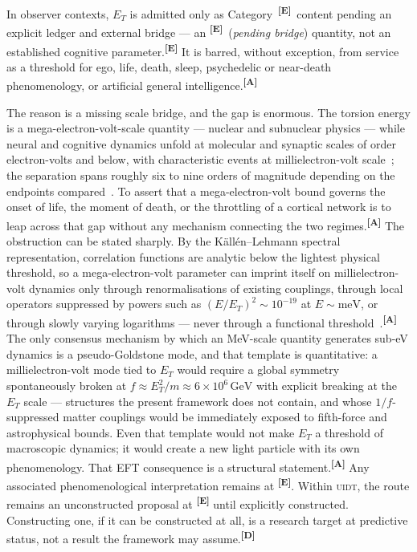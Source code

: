 \documentclass[12pt,a4paper,twoside]{article}
\theoremstyle{plain}
\theoremstyle{definition}
\theoremstyle{remark}
\newcommand{\UIDT}{\textsc{uidt}}
\newcommand{\catmark}[1]{\textsuperscript{\textsf{\textbf{[#1]}}}}
\begin{document}
In observer contexts, $E_T$ is admitted only as Category~\catmark{E}\
content pending an explicit ledger and external bridge --- an
\catmark{E}\ (\emph{pending bridge}) quantity, not an established cognitive
parameter.\catmark{E} It is barred, without exception, from service as a
threshold for ego, life, death, sleep, psychedelic or near-death
phenomenology, or artificial general intelligence.\catmark{A}

The reason is a missing scale bridge, and the gap is enormous. The
torsion energy is a mega-electron-volt-scale quantity --- nuclear and
subnuclear physics --- while neural and cognitive dynamics unfold at
molecular and synaptic scales of order electron-volts and below, with
characteristic events at millielectron-volt scale~\cite{attwell2001,harris2012,levy2021}; the separation spans
roughly six to nine orders of magnitude depending on the endpoints
compared~\cite{appelquist1975}. To assert that a mega-electron-volt bound governs the onset of
life, the moment of death, or the throttling of a cortical network is to
leap across that gap without any mechanism connecting the two
regimes.\catmark{A} The obstruction can be stated sharply. By the
K\"all\'en--Lehmann spectral representation, correlation functions are
analytic below the lightest physical threshold, so a mega-electron-volt
parameter can imprint itself on millielectron-volt dynamics only through
renormalisations of existing couplings, through local operators
suppressed by powers such as $(E/E_T)^{2} \sim 10^{-19}$ at
$E \sim \mathrm{meV}$, or through slowly varying logarithms --- never
through a functional threshold~\cite{appelquist1975}.\catmark{A} The only consensus mechanism
by which an MeV-scale quantity generates sub-eV dynamics is a
pseudo-Goldstone mode, and that template is quantitative: a
millielectron-volt mode tied to $E_T$ would require a global symmetry
spontaneously broken at $f \approx E_T^{2}/m \approx
6\times10^{6}\,\mathrm{GeV}$ with explicit breaking at the $E_T$ scale
--- structures the present framework does not contain, and whose
$1/f$-suppressed matter couplings would be immediately exposed to
fifth-force and astrophysical bounds. Even that template would not make
$E_T$ a threshold of macroscopic dynamics; it would create a new light
particle with its own phenomenology. That EFT consequence is a structural
statement.\catmark{A} Any associated phenomenological interpretation remains
at \catmark{E}. Within \UIDT, the route remains an unconstructed proposal at
\catmark{E} until explicitly constructed. Constructing one, if it can
be constructed at all, is a research target at predictive status, not a
result the framework may assume.\catmark{D}
\end{document}
